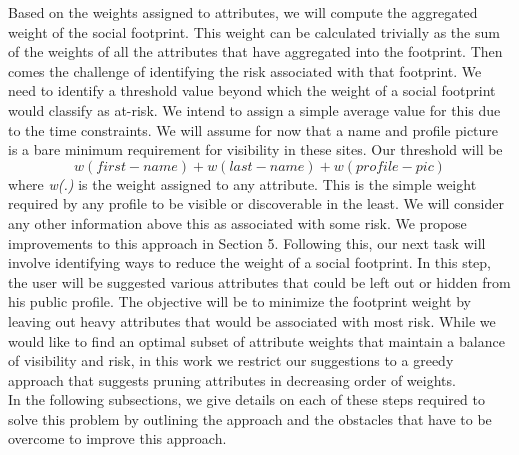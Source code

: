 \documentclass[10pt,conference]{IEEEtran}
\begin{document}
Based on the weights assigned to attributes, we will compute the aggregated weight of the social footprint. This weight can be calculated trivially as the sum of the weights of all the attributes that have aggregated into the footprint. Then comes the challenge of identifying the risk associated with that footprint. We need to identify a threshold value beyond which the weight of a social footprint would classify as at-risk. We intend to assign a simple average value for this due to the time constraints. We will assume for now that a name and profile picture is a bare minimum requirement for visibility in these sites. Our threshold will be 
\begin{equation}
w(first-name) + w(last-name) + w(profile-pic)
\end{equation}
where \textit{w(.)} is the weight assigned to any attribute. This is the simple weight required by any profile to be visible or discoverable in the least. We will consider any other information above this as associated with some risk. We propose improvements to this approach in Section 5. Following this, our next task will involve identifying ways to reduce the weight of a social footprint. In this step, the user will be suggested various attributes that could be left out or hidden from his public profile. The objective will be to minimize the footprint weight by leaving out heavy attributes that would be associated with most risk. While we would like to find an optimal subset of attribute weights that maintain a balance of visibility and risk, in this work we restrict our suggestions to a greedy approach that suggests pruning attributes in decreasing order of weights.\\

In the following subsections, we give details on each of these steps required to solve this problem by outlining the approach and the obstacles that have to be overcome to improve this approach.
\end{document}
